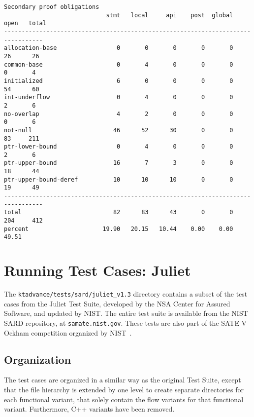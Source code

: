 \documentclass[11pt]{article}
\begin{document}
\begin{small}
\begin{verbatim}
Secondary proof obligations
                             stmt   local     api    post  global    open   total
---------------------------------------------------------------------------------
allocation-base                 0       0       0       0       0      26      26
common-base                     0       4       0       0       0       0       4
initialized                     6       0       0       0       0      54      60
int-underflow                   0       4       0       0       0       2       6
no-overlap                      4       2       0       0       0       0       6
not-null                       46      52      30       0       0      83     211
ptr-lower-bound                 0       4       0       0       0       2       6
ptr-upper-bound                16       7       3       0       0      18      44
ptr-upper-bound-deref          10      10      10       0       0      19      49
---------------------------------------------------------------------------------
total                          82      83      43       0       0     204     412
percent                     19.90   20.15   10.44    0.00    0.00   49.51
\end{verbatim}
\end{small}

\section{Running Test Cases: Juliet}

The {\tt ktadvance/tests/sard/juliet\_v1.3} directory contains a subset of the 
test cases from the Juliet Test Suite, developed by the NSA Center for Assured 
Software, and updated by NIST. The entire test suite is available from the
NIST SARD repository, at {\tt samate.nist.gov}. These tests are also part of the
SATE V Ockham competition organized by NIST~\cite{Ockham}.

\subsection{Organization}
The test cases are organized in a similar way as the original Test Suite, except 
that the file hierarchy is extended by one level to create separate directories 
for each functional variant, that solely contain the flow variants for that 
functional variant. Furthermore, C++ variants have been removed.
\end{document}
